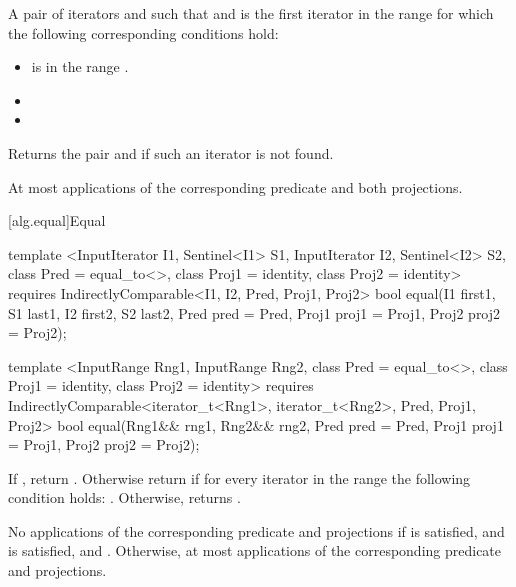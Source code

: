 \begin{itemdescr}
\pnum
\returns
A pair of iterators
and
such that
and
is the first iterator
in the range 
for which the following corresponding conditions hold:

\begin{itemize}
\item {} is in the range \tcode{[first2, last2)}.
\item {}
\item {}
\end{itemize}

Returns the pair
and
if such an iterator
is not found.

\pnum
\complexity
At most
applications of the corresponding predicate and both projections.
\end{itemdescr}

[alg.equal]{Equal}

%
\begin{itemdecl}
template <InputIterator I1, Sentinel<I1> S1, InputIterator I2, Sentinel<I2> S2,
    class Pred = equal_to<>, class Proj1 = identity, class Proj2 = identity>
  requires IndirectlyComparable<I1, I2, Pred, Proj1, Proj2>
  bool equal(I1 first1, S1 last1, I2 first2, S2 last2,
             Pred pred = Pred{},
             Proj1 proj1 = Proj1{}, Proj2 proj2 = Proj2{});

template <InputRange Rng1, InputRange Rng2, class Pred = equal_to<>,
    class Proj1 = identity, class Proj2 = identity>
  requires IndirectlyComparable<iterator_t<Rng1>, iterator_t<Rng2>, Pred, Proj1, Proj2>
  bool equal(Rng1&& rng1, Rng2&& rng2, Pred pred = Pred{},
             Proj1 proj1 = Proj1{}, Proj2 proj2 = Proj2{});
\end{itemdecl}

\begin{itemdescr}
\pnum
\returns
If
,
return
.
Otherwise return
if for every iterator
in the range 
the following condition holds:
.
Otherwise, returns
.

\pnum
\complexity
No applications of the corresponding predicate and projections if
 is satisfied, and
 is satisfied,
and
.
Otherwise, at most
applications of the corresponding predicate and projections.
\end{itemdescr}

